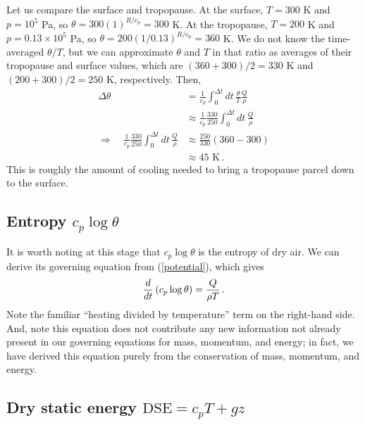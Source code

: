 \documentclass[12pt]{article}
\begin{document}
Let us compare the surface and tropopause.   At the surface, $T = 300$ K and $p = 10^5$ Pa, so $\theta = 300 (1)^{R/c_p} = 300$ K.  At the tropopause, $T = 200$ K and $p = 0.13 \times 10^5$ Pa, so $\theta = 200 (1/0.13)^{R/c_p} = 360$ K.  We do not know the time-averaged $\theta/T$, but we can approximate $\theta$ and $T$ in that ratio as averages of their tropopause and surface values, which are $(360+300)/2 = 330$ K and $(200+300)/2 = 250$ K, respectively.  Then,
\begin{align}
\Delta \theta &= \frac{1}{c_p} \int_0^{\Delta t} dt \, \frac{\theta}{T} \frac{Q}{\rho} \\
&\approx \frac{1}{c_p} \frac{330}{250} \int_0^{\Delta t} dt \, \frac{Q}{\rho} \\
\Rightarrow \quad \frac{1}{c_p} \frac{330}{250} \int_0^{\Delta t} dt \, \frac{Q}{\rho} &\approx \frac{250}{330} (360-300) \\
&\approx 45 \text{ K} \, .
\end{align}
This is roughly the amount of cooling needed to bring a tropopause parcel down to the surface.


\subsection{Entropy $c_p \log \theta$}


It is worth noting at this stage that $c_p \log \theta$ is the entropy of dry air.  We can derive its governing equation from (\ref{potential}), which gives
\[
{\frac{d}{dt}} \left( c_p \log \theta \right) = \frac{Q}{\rho T} \, .
\]
Note the familiar ``heating divided by temperature'' term on the right-hand side.  And, note this equation does not contribute any new information not already present in our governing equations for mass, momentum, and energy; in fact, we have derived this equation purely from the conservation of mass, momentum, and energy.


\subsection{Dry static energy $\text{DSE} = c_p T + gz$} \label{subsec_dse}
\end{document}
